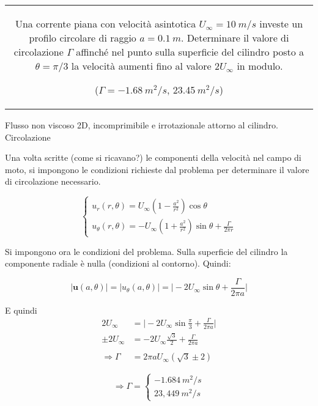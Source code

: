 \noindent
\begin{tabular}{c}
\begin{minipage}[b]{0.95\textwidth}
\begin{exerciseS}
Una corrente piana con velocit\`{a} asintotica $U_\infty=10\ m/s$ investe un profilo circolare
di raggio $a=0.1\ m$. Determinare il valore di circolazione $\Gamma$ affinch\'{e} nel 
punto sulla superficie del cilindro posto a $\theta=\pi/3$ la velocit\`{a} aumenti fino al valore 
$2U_\infty$ in modulo.

($\Gamma = -1.68\ m^2 / s$, 23.45$\ m^2 / s$)
\end{exerciseS}
\end{minipage}
\end{tabular}


\sol

\partone
  Flusso non viscoso 2D, incomprimibile e irrotazionale attorno al cilindro. Circolazione

\parttwo
 Una volta scritte (come si ricavano?) le componenti della velocità nel campo di moto, si
impongono le condizioni richieste dal problema per determinare il valore di circolazione necessario.

\begin{equation}
\begin{cases}
  u_r (r,\theta) = U_\infty \displaystyle \left(1 - \frac{a^2}{r^2}\right)\cos{\theta} \\
  u_\theta (r,\theta) = - U_\infty \displaystyle \left(1 + \frac{a^2}{r^2}\right)\sin{\theta} + \frac{\Gamma}{2\pi r}
\end{cases}
\end{equation}

\vspace{0.2cm}
Si impongono ora le condizioni del problema. Sulla superficie del cilindro la componente radiale è nulla (condizioni al contorno). Quindi:

\begin{equation}
  |\bm{u}(a,\theta)| = |u_\theta(a,\theta)| = \Big| - 2 U_\infty \sin{\theta} + \frac{\Gamma}{2 \pi a} \Big|
\end{equation}

E quindi
\vspace{0.2cm}
\begin{equation}
\begin{aligned}
  2 U_\infty & = \Big| - 2 U_\infty \sin{\frac{\pi}{3}} + \frac{\Gamma}{2 \pi a} \Big| \\
  \pm 2 U_\infty & = - 2 U_\infty \frac{\sqrt{3}}{2} + \frac{\Gamma}{2 \pi a} \\
  \\
  \Rightarrow \Gamma  & = 2 \pi a U_\infty (\sqrt{3} \pm 2)
\end{aligned}
\end{equation}

\begin{equation}
  \Rightarrow \Gamma = 
  \begin{cases}
    -1.684 \ m^2/s \\
    23,449 \ m^2/s
  \end{cases}
\end{equation}

